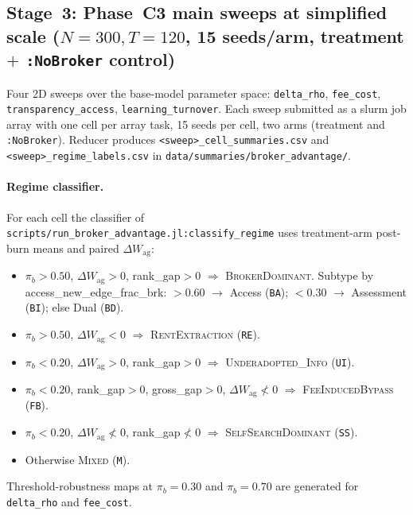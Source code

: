 \documentclass[11pt,a4paper]{article}
\begin{document}
\subsection{Stage~3: Phase~C3 main sweeps at simplified scale ($N{=}300, T{=}120$, 15 seeds/arm, treatment $+$ \texttt{:NoBroker} control)}
\label{sec:c3}

Four 2D sweeps over the base-model parameter space: \texttt{delta\_rho}, \texttt{fee\_cost}, \texttt{transparency\_access}, \texttt{learning\_turnover}. Each sweep submitted as a slurm job array with one cell per array task, 15 seeds per cell, two arms (treatment and \texttt{:NoBroker}). Reducer produces \texttt{<sweep>\_cell\_summaries.csv} and \texttt{<sweep>\_regime\_labels.csv} in \texttt{data/summaries/broker\_advantage/}.

\paragraph{Regime classifier.} For each cell the classifier of \texttt{scripts/run\_broker\_advantage.jl:classify\_regime} uses treatment-arm post-burn means and paired $\Delta W_{\text{ag}}$:
\begin{itemize}[leftmargin=1.5em]
\item $\pi_b{>}0.50$, $\Delta W_{\text{ag}}{>}0$, rank\_gap${>}0$ $\Rightarrow$ \textsc{BrokerDominant}. Subtype by access\_new\_edge\_frac\_brk: $>$0.60 $\to$ Access (\texttt{BA}); $<$0.30 $\to$ Assessment (\texttt{BI}); else Dual (\texttt{BD}).
\item $\pi_b{>}0.50$, $\Delta W_{\text{ag}}{<}0$ $\Rightarrow$ \textsc{RentExtraction} (\texttt{RE}).
\item $\pi_b{<}0.20$, $\Delta W_{\text{ag}}{>}0$, rank\_gap${>}0$ $\Rightarrow$ \textsc{Underadopted\_Info} (\texttt{UI}).
\item $\pi_b{<}0.20$, rank\_gap${>}0$, gross\_gap${>}0$, $\Delta W_{\text{ag}}\nless 0$ $\Rightarrow$ \textsc{FeeInducedBypass} (\texttt{FB}).
\item $\pi_b{<}0.20$, $\Delta W_{\text{ag}}\nless 0$, rank\_gap$\nless 0$ $\Rightarrow$ \textsc{SelfSearchDominant} (\texttt{SS}).
\item Otherwise \textsc{Mixed} (\texttt{M}).
\end{itemize}
Threshold-robustness maps at $\pi_b{=}0.30$ and $\pi_b{=}0.70$ are generated for \texttt{delta\_rho} and \texttt{fee\_cost}.
\end{document}
